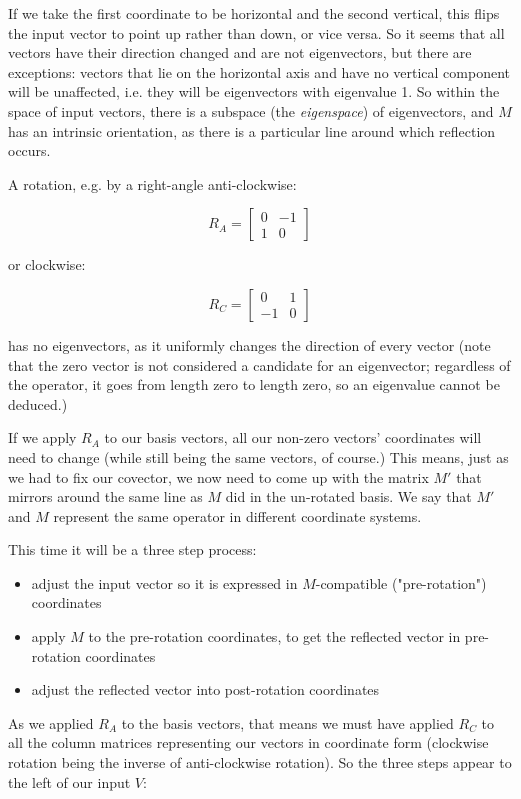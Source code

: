 If we take the first coordinate to be horizontal and the second vertical, this flips the input vector to point up rather than down, or vice versa. So it seems that all vectors have their direction changed and are not eigenvectors, but there are exceptions: vectors that lie on the horizontal axis and have no vertical component will be unaffected, i.e. they will be eigenvectors with eigenvalue 1. So within the space of input vectors, there is a subspace (the \textit{eigenspace}) of eigenvectors, and $M$ has an intrinsic orientation, as there is a particular line around which reflection occurs.

A rotation, e.g. by a right-angle anti-clockwise:

$$R_A = \begin{bmatrix}0 & -1 \\ 1 & 0\end{bmatrix}$$

or clockwise:

$$R_C = \begin{bmatrix}0 & 1 \\ -1 & 0\end{bmatrix}$$

has no eigenvectors, as it uniformly changes the direction of every vector (note that the zero vector is not considered a candidate for an eigenvector; regardless of the operator, it goes from length zero to length zero, so an eigenvalue cannot be deduced.)

If we apply $R_A$ to our basis vectors, all our non-zero vectors' coordinates will need to change (while still being the same vectors, of course.) This means, just as we had to fix our covector, we now need to come up with the matrix $M'$ that mirrors around the same line as $M$ did in the un-rotated basis. We say that $M'$ and $M$ represent the same operator in different coordinate systems.

This time it will be a three step process:

\begin{itemize}
    \item adjust the input vector so it is expressed in $M$-compatible ("pre-rotation") coordinates
    \item apply $M$ to the pre-rotation coordinates, to get the reflected vector in pre-rotation coordinates
    \item adjust the reflected vector into post-rotation coordinates
\end{itemize}

As we applied $R_A$ to the basis vectors, that means we must have applied $R_C$ to all the column matrices representing our vectors in coordinate form (clockwise rotation being the inverse of anti-clockwise rotation). So the three steps appear to the left of our input $V$:

